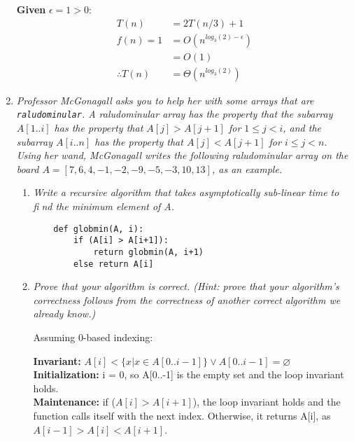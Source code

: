 \documentclass[12pt]{article} \setlength{\oddsidemargin}{0in}
\begin{document}
\begin{enumerate}
  \textbf{Given} $\epsilon = 1 > 0$: \\
  \begin{align}
  T(n) &= 2T(n/3) + 1 \\
  f(n) = 1 &= O(n^{log_3(2) - \epsilon}) \\
  &= O(1) \\
  \therefore T(n) &= \Theta(n^{log_3(2)})
  \end{align}

  
  \newpage

\item \textit{Professor McGonagall asks you to help her with some
    arrays that are \texttt{raludominular}. A raludominular array has
    the property that the subarray $A[1..i]$ has the property that
    $A[j] > A[j + 1]$ for $1 \le j < i$, and the subarray $A[i..n]$ has
    the property that $A[j] < A[j + 1]$ for $i \le j < n$. Using her
    wand, McGonagall writes the following raludominular array on the
    board $A = [7, 6, 4, -1, -2, -9, -5, -3, 10, 13]$, as an example.}

  \begin{enumerate}
  \item \textit{Write a recursive algorithm that takes asymptotically
      sub-linear time to find the minimum element of A.}
    
    \begin{verbatim}
    def globmin(A, i):
        if (A[i] > A[i+1]):
            return globmin(A, i+1)
        else return A[i]
    \end{verbatim}
    
  \item \textit{Prove that your algorithm is correct. (Hint: prove
      that your algorithm's correctness follows from the correctness
      of another correct algorithm we already know.)}

    Assuming 0-based indexing:
    \medskip

    \textbf{Invariant:} $A[i] < \{x | x \in A[0..i-1]\} \vee A[0..i-1] = \varnothing$ \\

    \textbf{Initialization:} i = 0, so A[0..-1] is the empty set and the loop invariant holds. \\

    \textbf{Maintenance:} if ($A[i] > A[i+1]$), the loop invariant holds and the function calls itself with the next index. Otherwise, it returns A[i], as $A[i-1] > A[i] < A[i+1]$. \\


\end{enumerate}
\end{enumerate}
\end{document}

